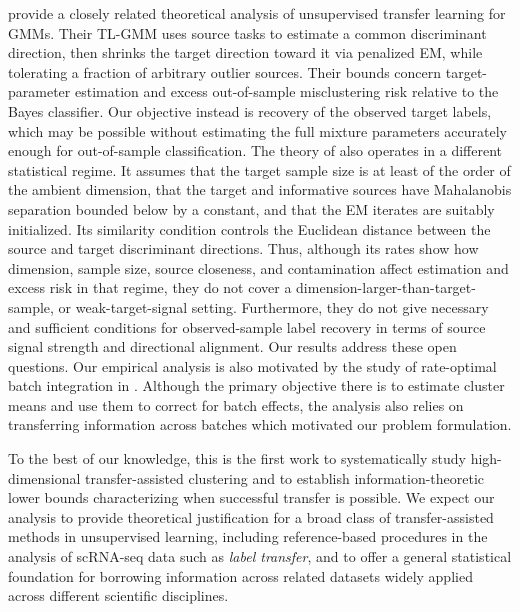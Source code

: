 \documentclass[10pt]{article}
\begin{document}
\citet{tian2025robust} provide a closely related theoretical analysis of unsupervised transfer learning for GMMs. Their TL-GMM uses source tasks to estimate a common discriminant direction, then shrinks the target direction toward it via penalized EM, while tolerating a fraction of arbitrary outlier sources. Their bounds concern target-parameter estimation and excess out-of-sample misclustering risk relative to the Bayes classifier. Our objective instead is recovery of the observed target labels, which may be possible without estimating the full mixture parameters accurately enough for out-of-sample classification.
The theory of \citet{tian2025robust} also operates in a different statistical regime. It assumes that the target sample size is at least of the order of the
ambient dimension, that the target and informative sources have Mahalanobis separation bounded below by a constant, and that the EM iterates are suitably initialized. Its similarity condition controls the Euclidean distance between
the source and target discriminant directions. Thus, although its rates show how dimension, sample size, source closeness, and contamination affect estimation and excess risk in that regime, they do not cover a dimension-larger-than-target-sample, or weak-target-signal setting. Furthermore, they do not
give necessary and sufficient conditions for observed-sample label recovery in
terms of source signal strength and directional alignment. Our results address
these open questions. Our empirical analysis is also motivated by the study of
rate-optimal batch integration in \cite{cao2025modah}. Although the primary
objective there is to estimate cluster means and use them to correct for batch
effects, the analysis also relies on transferring information across batches
which motivated our problem formulation.

To the best of our knowledge, this is the first work to systematically study high-dimensional transfer-assisted clustering and to establish information-theoretic lower bounds characterizing when successful transfer is possible. We expect our analysis to provide theoretical justification for a broad class of transfer-assisted methods in unsupervised learning, including reference-based procedures in the analysis of scRNA-seq data such as \emph{label transfer}, and to offer a general statistical foundation for borrowing information across related datasets widely applied across different scientific disciplines.
\end{document}
